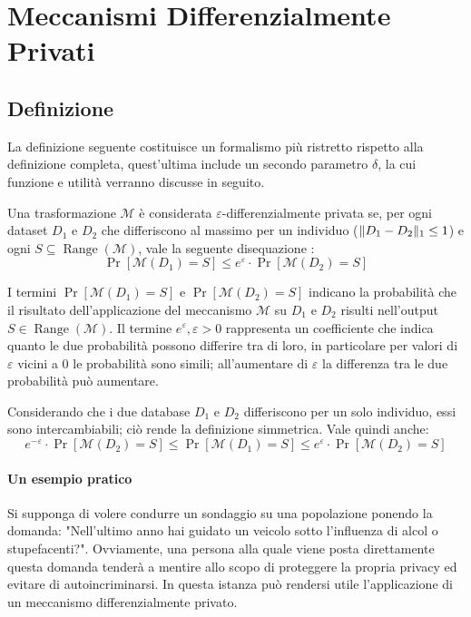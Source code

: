 \chapter{Meccanismi Differenzialmente Privati}


\section{Definizione}
La definizione seguente costituisce un formalismo più ristretto rispetto alla definizione completa, quest'ultima include un secondo parametro $\mathcal{\delta}$, la cui funzione e utilità verranno discusse in seguito.

Una trasformazione $\mathcal{M}$ è considerata $\varepsilon$-differenzialmente privata se, per ogni dataset $D_1$ e $D_2$ che differiscono al massimo per un individuo ($\lVert D_1 - D_2\rVert_1 \le 1$) e ogni $S \subseteq \operatorname{Range}(\mathcal{M})$, vale la seguente disequazione \cite{10.1007/11681878_14}:
\begin{equation}
  \Pr[\mathcal{M}(D_1) = S] \le e^{\varepsilon} \cdot \Pr[\mathcal{M}(D_2) = S]
  \label{eq:e_differential_privacy}
\end{equation}

I termini $\Pr[\mathcal{M}(D_1) = S]$ e $\Pr[\mathcal{M}(D_2) = S]$ indicano la probabilità che il risultato dell'applicazione del meccanismo $\mathcal{M}$ su $D_1$ e $D_2$ risulti nell'output $S \in \operatorname{Range}(\mathcal{M})$.
Il termine $e^\varepsilon, \varepsilon > 0$ rappresenta un coefficiente che indica quanto le due probabilità possono differire tra di loro, in particolare per valori di $\varepsilon$ vicini a $0$ le probabilità sono simili; all'aumentare di $\varepsilon$ la differenza tra le due probabilità può aumentare.

Considerando che i due database $D_1$ e $D_2$ differiscono per un solo individuo, essi sono intercambiabili; ciò rende la definizione simmetrica. Vale quindi anche:
\begin{equation}
  e^{-\varepsilon} \cdot \Pr[\mathcal{M}(D_2) = S] \le \Pr[\mathcal{M}(D_1) = S] \le e^{\varepsilon} \cdot \Pr[\mathcal{M}(D_2) = S]
  \label{eq:e_differential_privacy_symm}
\end{equation}

\subsubsection{Un esempio pratico}
\label{ex:coint_toss}
Si supponga di volere condurre un sondaggio su una popolazione ponendo la domanda: "Nell'ultimo anno hai guidato un veicolo sotto l'influenza di alcol o stupefacenti?".
Ovviamente, una persona alla quale viene posta direttamente questa domanda tenderà a mentire allo scopo di proteggere la propria privacy ed evitare di autoincriminarsi. In questa istanza può rendersi utile l'applicazione di un meccanismo differenzialmente privato.

